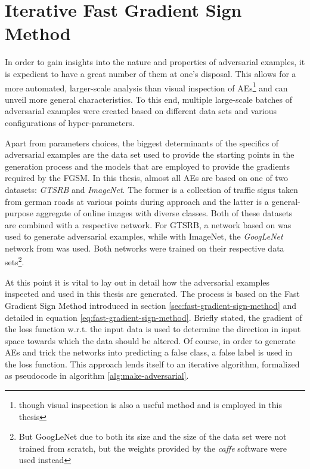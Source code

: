 \documentclass[11pt, a4paper]{article}
\begin{document}
\section{Iterative Fast Gradient Sign Method}
\label{sec:iterative-fgsm}
In order to gain insights into the nature and properties of adversarial examples, it is expedient to have a great number of them at one's disposal. This allows for a more automated, larger-scale analysis than visual inspection of AEs\footnote{though visual inspection is also a useful method and is employed in this thesis} and can unveil more general characteristics. To this end, multiple large-scale batches of adversarial examples were created based on different data sets and various configurations of hyper-parameters. 

Apart from parameters choices, the biggest determinants of the specifics of adversarial examples are the data set used to provide the starting points in the generation process and the models that are employed to provide the gradients required by the FGSM. In this thesis, almost all AEs are based on one of two datasets: \emph{GTSRB} and \emph{ImageNet}. The former is a collection of traffic signs taken from german roads at various points during approach and the latter is a general-purpose aggregate of online images with diverse classes. Both of these datasets are combined with a respective network. For GTSRB, a network based on \cite{multi-column-neural-network-gtsrb} was used to generate adversarial examples, while with ImageNet, the \emph{GoogLeNet} network from \cite{going-deeper-with-convolutions} was used. Both networks were trained on their respective data sets\footnote{But GoogLeNet due to both its size and the size of the data set were not trained from scratch, but the weights provided by the \emph{caffe} software were used instead}.

At this point it is vital to lay out in detail how the adversarial examples inspected and used in this thesis are generated. The process is based on the Fast Gradient Sign Method introduced in section \ref{sec:fast-gradient-sign-method} and detailed in equation \eqref{eq:fast-gradient-sign-method}. Briefly stated, the gradient of the loss function w.r.t. the input data is used to determine the direction in input space towards which the data should be altered. Of course, in order to generate AEs and trick the networks into predicting a false class, a false label is used in the loss function. This approach lends itself to an iterative algorithm, formalized as pseudocode in algorithm \ref{alg:make-adversarial}.
\end{document}
